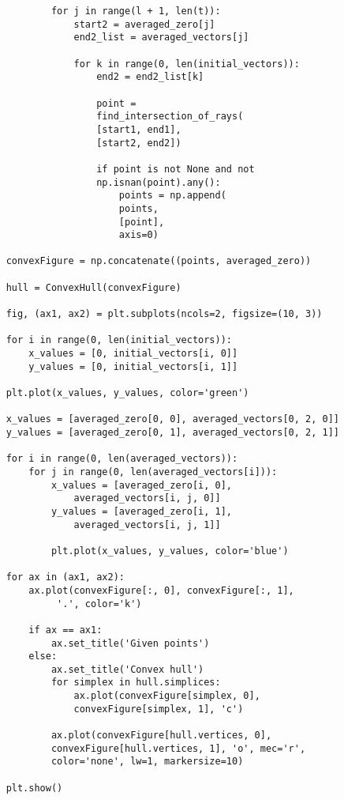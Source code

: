 \documentclass[12pt]{article}
\begin{document}
\begin{verbatim}
			for j in range(l + 1, len(t)):
				start2 = averaged_zero[j]
				end2_list = averaged_vectors[j]
				
				for k in range(0, len(initial_vectors)):
					end2 = end2_list[k]
					
					point = 
					find_intersection_of_rays(
					[start1, end1], 
					[start2, end2])
					
					if point is not None and not 
					np.isnan(point).any():
						points = np.append(
						points, 
						[point], 
						axis=0)
	
	convexFigure = np.concatenate((points, averaged_zero))
	
	hull = ConvexHull(convexFigure)
	
	fig, (ax1, ax2) = plt.subplots(ncols=2, figsize=(10, 3))
	
	for i in range(0, len(initial_vectors)):
		x_values = [0, initial_vectors[i, 0]]
		y_values = [0, initial_vectors[i, 1]]
	
	plt.plot(x_values, y_values, color='green')
	
	x_values = [averaged_zero[0, 0], averaged_vectors[0, 2, 0]]
	y_values = [averaged_zero[0, 1], averaged_vectors[0, 2, 1]]
	
	for i in range(0, len(averaged_vectors)):
		for j in range(0, len(averaged_vectors[i])):
			x_values = [averaged_zero[i, 0], 
				averaged_vectors[i, j, 0]]
			y_values = [averaged_zero[i, 1], 
				averaged_vectors[i, j, 1]]
		
			plt.plot(x_values, y_values, color='blue')
	
	for ax in (ax1, ax2):
		ax.plot(convexFigure[:, 0], convexFigure[:, 1],
			 '.', color='k')
		
		if ax == ax1:
			ax.set_title('Given points')
		else:
			ax.set_title('Convex hull')
			for simplex in hull.simplices:
				ax.plot(convexFigure[simplex, 0], 
				convexFigure[simplex, 1], 'c')
			
			ax.plot(convexFigure[hull.vertices, 0], 
			convexFigure[hull.vertices, 1], 'o', mec='r', 
			color='none', lw=1, markersize=10)
	
	plt.show()
	
	
\end{verbatim}
	
\end{document}
